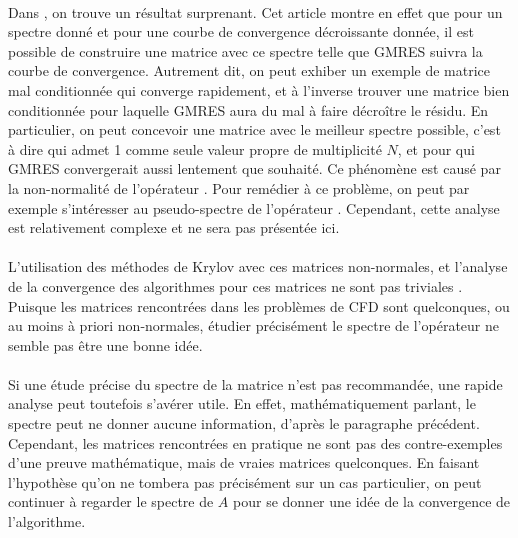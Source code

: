 		\paragraph{}
		Dans \cite{GreenbaumPtakStrakos1996}, on trouve un résultat surprenant.
		Cet article montre en effet que pour un spectre donné et pour une courbe de convergence décroissante donnée, il est possible de construire une matrice avec ce spectre telle que GMRES suivra la courbe de convergence.
		Autrement dit, on peut exhiber un exemple de matrice mal conditionnée qui converge rapidement, et à l'inverse trouver une matrice bien conditionnée pour laquelle GMRES aura du mal à faire décroître le résidu.
		En particulier, on peut concevoir une matrice avec le meilleur spectre possible, c'est à dire qui admet 1 comme seule valeur propre de multiplicité $N$, et pour qui GMRES convergerait aussi lentement que souhaité.
		Ce phénomène est causé par la non-normalité de l'opérateur \cite{GreenbaumStrakos1994, GreenbaumPtakStrakos1996}.
		Pour remédier à ce problème, on peut par exemple s'intéresser au pseudo-spectre de l'opérateur \cite{Trefethen1999}.
		Cependant, cette analyse est relativement complexe et ne sera pas présentée ici.

		\paragraph{}
		L'utilisation des méthodes de Krylov avec ces matrices non-normales, et l'analyse de la convergence des algorithmes pour ces matrices ne sont pas triviales \cite{LiesenTichy2004, Huhtanen2005}.
		Puisque les matrices rencontrées dans les problèmes de CFD sont quelconques, ou au moins à priori non-normales, étudier précisément le spectre de l'opérateur ne semble pas être une bonne idée.

		\paragraph{}
		Si une étude précise du spectre de la matrice n'est pas recommandée, une rapide analyse peut toutefois s'avérer utile.
		En effet, mathématiquement parlant, le spectre peut ne donner aucune information, d'après le paragraphe précédent.
		Cependant, les matrices rencontrées en pratique ne sont pas des contre-exemples d'une preuve mathématique, mais de vraies matrices quelconques.
		En faisant l'hypothèse qu'on ne tombera pas précisément sur un cas particulier, on peut continuer à regarder le spectre de $A$ pour se donner une idée de la convergence de l'algorithme.


